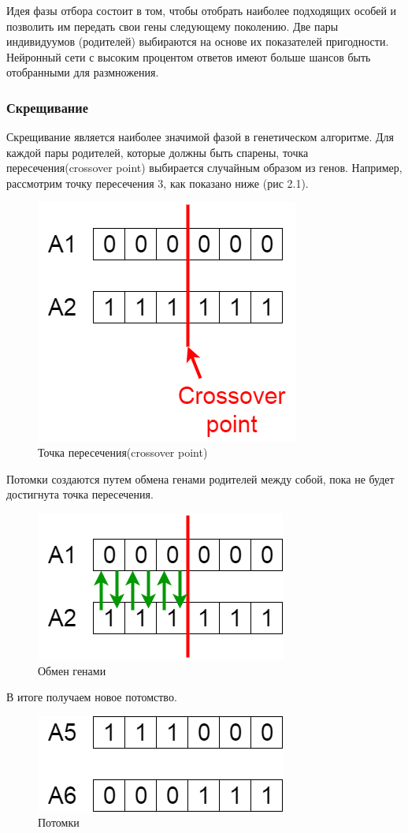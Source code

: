 Идея фазы отбора состоит в том, чтобы отобрать наиболее подходящих особей и позволить им передать свои гены следующему поколению. Две пары индивидуумов (родителей) выбираются на основе их показателей пригодности. Нейронный сети с высоким процентом ответов имеют больше шансов быть отобранными для размножения.

\subsubsection{Скрещивание}
\indent \indent Скрещивание является наиболее значимой фазой в генетическом алгоритме. Для каждой пары родителей, которые должны быть спарены, точка пересечения(crossover point) выбирается случайным образом из генов.
Например, рассмотрим точку пересечения 3, как показано ниже (рис 2.1). 

\begin{figure}[H]
  \centering
  \includegraphics[width=0.4\linewidth]{./img/crossover-point}
  \caption{Точка пересечения(crossover point)}
  \label{fig:mpr}
\end{figure} 

Потомки создаются путем обмена генами родителей между собой, пока не будет достигнута точка пересечения.

\begin{figure}[H]
  \centering
  \includegraphics[width=0.4\linewidth]{./img/genesis}
  \caption{Обмен генами}
  \label{fig:mpr}
\end{figure} 

В итоге получаем новое потомство.

\begin{figure}[H]
  \centering
  \includegraphics[width=0.4\linewidth]{./img/child}
  \caption{Потомки}
  \label{fig:mpr}
\end{figure}

